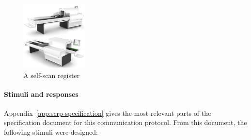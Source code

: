 \begin{figure}[ht]
  \begin{center}
    \includegraphics[width=0.3\textwidth]{scanflow.jpg}
  \end{center}
  \caption{A self-scan register}
  \label{fig:register}
\end{figure}

\paragraph*{Stimuli and responses}
Appendix~\ref{app:scrp-specification} gives the most relevant parts of the specification document for this communication protocol. From this document, the following stimuli were designed:
